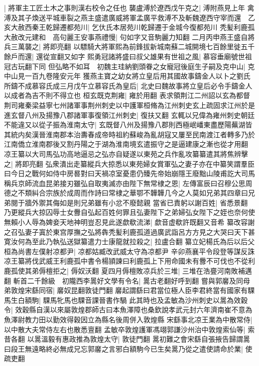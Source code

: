 |{
	將軍主工匠土木之事則漢右校令之任也}
襲盧溥於遼西戊午克之|{
	溥附燕見上年}
禽溥及其子煥送平城車裂之燕主盛遣廣威將軍孟廣平救溥不及斬魏遼西守宰而還　乙亥大赦西秦王乾歸遷都苑川|{
	乞㐲氏本居苑川乾歸遷于金城今復都苑川}
秃髪利鹿孤大赦改元建和　高句麗王安事燕禮慢|{
	句如字又音駒麗力知翻}
二月丙申燕王盛自將兵三萬襲之|{
	將即亮翻}
以驃騎大將軍熙為前鋒拔新城南蘇二城開境七百餘里徙五千餘戶而還|{
	還從宣翻又如字}
熙勇冠諸將盛曰叔父雄果有世祖之風|{
	慕容垂廟號世祖冠古玩翻下同}
但弘略不如耳　初魏主珪納劉頭眷之女寵冠後庭生子嗣及克中山|{
	克中山見一百九卷隆安元年}
獲燕主寶之幼女將立皇后用其國故事鑄金人以卜之劉氏所鑄不成慕容氏成三月戊午立慕容氏為皇后|{
	北史曰魏故事將立皇后必令手鑄金人以成者為吉不則不得立也}
桓玄既克荆雍|{
	雍於用翻}
表求領荆江二州詔以玄為都督荆司雍秦梁益寧七州諸軍事荆州刺史以中護軍桓脩為江州刺史玄上疏固求江州於是進玄督八州及揚豫八郡諸軍事復領江州刺史|{
	復扶又翻}
玄輒以兄偉為雍州刺史朝廷不能違又以從子振為淮南太守|{
	玄既督八州及揚豫八郡則西極岷嶓東盡歷陽蕪湖皆其統内矣漢晉淮南郡本治夀春成帝時祖約蘇峻為亂胡寇又屢至民南渡江者轉多乃於江南僑立淮南郡後又割丹陽之于湖為淮南境玄遣振守之是逼建康之漸也從才用翻}
凉王纂以大司馬弘功高地逼忌之弘亦自疑遂以東苑之兵作亂攻纂纂遣其將焦辨擊之|{
	將即亮翻}
弘衆潰出走纂縱兵大掠悉以東苑婦女賞軍弘之妻子亦在中纂笑謂羣臣曰今日之戰何如侍中房晷對曰天禍凉室憂患仍臻先帝始崩隱王廢黜山陵甫訖大司馬稱兵京師流血昆弟接刃雖弘自取夷滅亦由陛下無常棣之恩|{
	左傳富辰曰召穆公思周德之不類糾合宗族於成周而作詩曰常棣之華鄂不韡韡几今之人莫如兄弟其四章曰兄弟閱于牆外禦其侮如是則兄弟雖有小忿不廢懿親}
當省已責躬以謝百姓|{
	省悉景翻}
乃更縱兵大掠囚辱士女釁自弘起百姓何罪且弘妻陛下之弟婦弘女陛下之姪也奈何使無賴小人辱為婢妾天地神明豈忍見此遂歔欷流涕|{
	歔音虚欷許既翻又音希}
纂改容謝之召弘妻子寘於東宫厚撫之弘將犇秃髪利鹿孤道過廣武詣呂方方見之大哭曰天下甚寛汝何為至此乃執弘送獄纂遣力士康龍就拉殺之|{
	拉盧合翻}
纂立妃楊氏為后以后父桓為尚書左僕射凉都尹|{
	凉都姑臧改武威太守為凉都尹}
辛卯燕襄平令段登等謀反誅　凉王纂將伐武威王利鹿孤中書令楊頴諫曰利鹿孤上下用命國未有釁不可伐也不從利鹿孤使其弟傉檀拒之|{
	傉奴沃翻}
夏四月傉檀敗凉兵於三堆|{
	三堆在浩亹河南敗補邁翻}
斬首二千餘級　初隴西李暠好文學有令名|{
	暠古老翻好呼到翻}
嘗與郭黁及同母弟敦煌宋繇同宿|{
	黁奴昆翻敦徒門翻}
黁起謂繇曰君當位極人臣李君終當有國家有騍馬生白額駒|{
	騍馬牝馬也騍音課晉書作騧}
此其時也及孟敏為沙州刺史以暠為效穀令|{
	效穀縣自漢以來屬敦煌郡師古曰本魚澤障也桑欽說孝武元封六年濟南崔不意為魚澤尉教力田以勤效得穀因立為縣名後周併入敦煌縣}
宋繇事北凉王業為中散常侍|{
	以中散大夫常侍左右也散悉亶翻}
孟敏卒敦煌護軍馮翊郭謙沙州治中敦煌索仙等|{
	索昔各翻}
以暠溫毅有惠政推為敦煌太守|{
	敦徒門翻}
暠初難之會宋繇自張掖告歸謂暠曰段王無遠略終必無成兄忘郭黁之言邪白額駒今已生矣暠乃從之遣使請命於業|{
	使疏吏翻}
